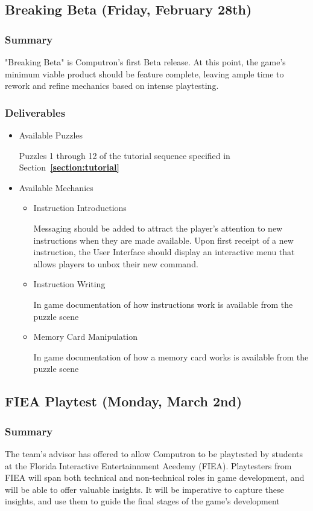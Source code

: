 \subsection{Breaking Beta (Friday, February 28th)}

\subsubsection*{Summary}
"Breaking Beta" is Computron's first Beta release. At this point, the game's minimum viable product should be feature complete, leaving ample time to rework and refine mechanics based on intense playtesting.

\subsubsection*{Deliverables}
\begin{itemize}

  \item Available Puzzles
  
  Puzzles 1 through 12 of the tutorial sequence specified in Section~\textbf{\ref{section:tutorial}}

  \item Available Mechanics
  \begin{itemize}
    \item Instruction Introductions
    
    Messaging should be added to attract the player's attention to new instructions when they are made available. Upon first receipt of a new instruction, the User Interface should display an interactive menu that allows players to unbox their new command.

    \item Instruction Writing
    
    In game documentation of how instructions work is available from the puzzle scene

    \item Memory Card Manipulation
    
    In game documentation of how a memory card works is available from the puzzle scene
  \end{itemize}
\end{itemize}

\subsection{FIEA Playtest (Monday, March 2nd)}
\subsubsection*{Summary}
The team's advisor has offered to allow Computron to be playtested by students at the Florida Interactive Entertainnment Acedemy (FIEA). Playtesters from FIEA will span both technical and non-technical roles in game development, and will be able to offer valuable insights. It will be imperative to capture these insights, and use them to guide the final stages of the game's development

